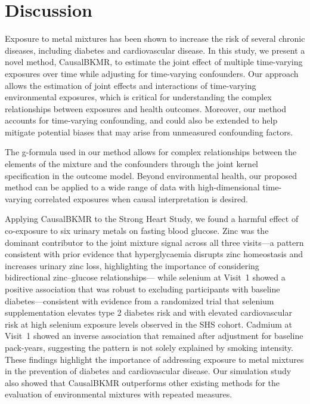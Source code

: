 
\section*{Discussion}

Exposure to metal mixtures has been shown to increase the risk of several chronic diseases, including diabetes and cardiovascular disease. In this study, we present a novel method, CausalBKMR, to estimate the joint effect of multiple time-varying exposures over time while adjusting for time-varying confounders. Our approach allows the estimation of joint effects and interactions of time-varying environmental exposures, which is critical for understanding the complex relationships between exposures and health outcomes. Moreover, our method accounts for time-varying confounding, and could also be extended to help mitigate potential biases that may arise from unmeasured confounding factors.

The g-formula used in our method allows for complex relationships between the elements of the mixture and the confounders through the joint kernel specification in the outcome model. Beyond environmental health, our proposed method can be applied to a wide range of data with high-dimensional time-varying correlated exposures when causal interpretation is desired.

Applying CausalBKMR to the Strong Heart Study, we found a harmful effect of co-exposure to six urinary metals on fasting blood glucose. Zinc was the dominant contributor to the joint mixture signal across all three visits---a pattern consistent with prior evidence that hyperglycaemia disrupts zinc homeostasis and increases urinary zinc loss,\cite{chausmer_1998} highlighting the importance of considering bidirectional zinc--glucose relationships--- while selenium at Visit~1 showed a positive association that was robust to excluding participants with baseline diabetes---consistent with evidence from a randomized trial that selenium supplementation elevates type 2 diabetes risk\cite{stranges_selenium_2007} and with elevated cardiovascular risk at high selenium exposure levels observed in the SHS cohort.\cite{zhao_2022} Cadmium at Visit~1 showed an inverse association that remained after adjustment for baseline pack-years, suggesting the pattern is not solely explained by smoking intensity. These findings highlight the importance of addressing exposure to metal mixtures in the prevention of diabetes and cardiovascular disease. Our simulation study also showed that CausalBKMR outperforms other existing methods for the evaluation of environmental mixtures with repeated measures.

